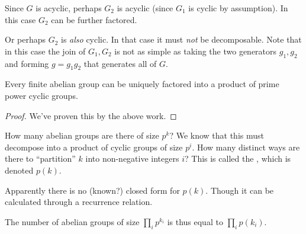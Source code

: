 \documentclass[11pt, oneside]{amsart}
\begin{document}
\begin{remark}
  Since $G$ is acyclic, perhaps $G_2$ is acyclic (since $G_1$ is cyclic
  by assumption). In this case $G_2$ can be further factored.

  Or perhaps $G_2$ is \emph{also} cyclic. In that case it must
  \emph{not} be decomposable. Note that in this case the join of $G_1,
  G_2$ is not as simple as taking the two generators $g_1, g_2$ and
  forming $g = g_1 g_2$ that generates all of $G$.
\end{remark}

\begin{theorem}

  Every finite abelian group can be uniquely factored into a product of
  prime power cyclic groups.
\end{theorem}

\begin{proof}
  We've proven this by the above work.
\end{proof}

\begin{remark}
  How many abelian groups are there of size $p^k$? We know that this
  must decompose into a product of cyclic groups of size $p^i$. How many
  distinct ways are there to ``partition'' $k$ into non-negative
  integers $i$? This is called the , which is
  denoted $p(k)$.

  Apparently there is no (known?) closed form for $p(k)$. Though it can
  be calculated through a recurrence relation.
\end{remark}

\begin{remark}
  The number of abelian groups of size $\prod_i p^{k_i}$ is thus equal
  to $\prod_i p(k_i)$.
\end{remark}

\end{document}
